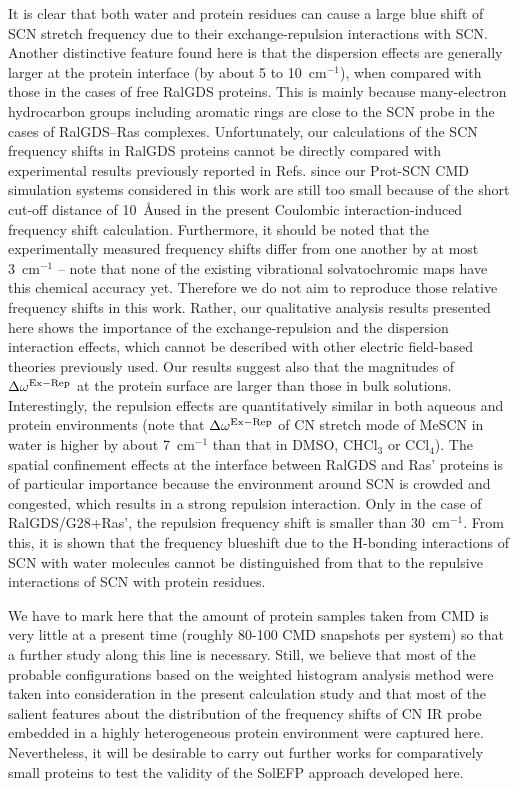 \documentclass[a4paper,titlepage,twoside,fleqn,12pt]{book}
\begin{document}
\begin{refsection}
It is clear that both water and protein residues can cause
a large blue shift of SCN stretch frequency due to their
exchange\hyp{}repulsion interactions with SCN. Another distinctive
feature found here is that the dispersion effects are generally
larger at the protein interface (by about 5 to 10~cm$^{-1}$), when
compared with those in the cases of free RalGDS proteins. This
is mainly because many\hyp{}electron hydrocarbon groups including
aromatic rings are close to the SCN probe in the cases of
RalGDS--Ras complexes. Unfortunately, our calculations of the
SCN frequency shifts in RalGDS proteins cannot be directly
compared with experimental results previously reported in
Refs. \citep{Stafford.Ensign.Webb.JPCB.2010,Ritchie.Webb.JPCB.2013,Ritchie.Webb.JPCB.2015} 
since our Prot-SCN CMD simulation systems considered in
this work are still too small because of the short cut\hyp{}off
distance of 10~\AA used in the present Coulombic interaction\hyp{}induced
frequency shift calculation. Furthermore, it should be noted
that the experimentally measured frequency shifts differ from
one another by at most 3~cm$^{-1}$ -- note that none of the existing
vibrational solvatochromic maps have this chemical accuracy
yet. Therefore we do not aim to reproduce those relative
frequency shifts in this work. Rather, our qualitative analysis
results presented here shows the importance of the exchange-repulsion
and the dispersion interaction effects, which cannot
be described with other electric field\hyp{}based theories previously
used. Our results suggest also that the magnitudes of
$\Delta\omega^{\rm Ex-Rep}$ at the protein surface are larger than those in bulk
solutions. Interestingly, the repulsion effects are quantitatively
similar in both aqueous and protein environments (note that
$\Delta\omega^{\rm Ex-Rep}$ of CN stretch mode of MeSCN in water is higher by
about 7~cm$^{-1}$ than that in DMSO, CHCl$_3$ or CCl$_4$). The spatial
confinement effects at the interface between RalGDS and Ras'
proteins is of particular importance because the environment
around SCN is crowded and congested, which results in a
strong repulsion interaction. Only in the case of
RalGDS/G28+Ras', the repulsion frequency shift is smaller
than 30~cm$^{-1}$. From this, it is shown that the frequency blueshift
due to the H-bonding interactions of SCN with water
molecules cannot be distinguished from that to the repulsive
interactions of SCN with protein residues.

We have to mark here that the amount of protein samples
taken from CMD is very little at a present time (roughly 80-100
CMD snapshots per system) so that a further study along this
line is necessary. Still, we believe that most of the probable
configurations based on the weighted histogram analysis
method were taken into consideration in the present
calculation study and that most of the salient features about
the distribution of the frequency shifts of CN IR probe
embedded in a highly heterogeneous protein environment
were captured here. Nevertheless, it will be desirable to carry
out further works for comparatively small proteins to test the
validity of the SolEFP approach developed here.




\end{refsection}
\end{document}
